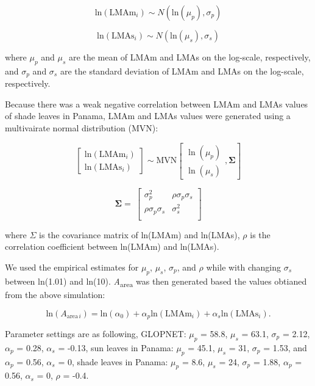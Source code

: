 \documentclass[
  12pt,
  letterpaper,
  DIV=11,
  numbers=noendperiod]{scrartcl}
\begin{document}
\[
\mathrm{ln}(\mathrm{LMAm}_{i}) \sim N(\mathrm{ln}(\mu_p), \sigma_p)
\]

\[
\mathrm{ln}(\mathrm{LMAs}_{i}) \sim N(\mathrm{ln}(\mu_s), \sigma_s)
\]

where \(\mu_p\) and \(\mu_s\) are the mean of LMAm and LMAs on the
log-scale, respectively, and \(\sigma_p\) and \(\sigma_s\) are the
standard deviation of LMAm and LMAs on the log-scale, respectively.

Because there was a weak negative correlation between LMAm and LMAs
values of shade leaves in Panama, LMAm and LMAs values were generated
using a multivairate normal distribution (MVN):

\[
\begin{bmatrix}
\mathrm{ln}(\mathrm{LMAm}_{i})\\
\mathrm{ln}(\mathrm{LMAs}_{i})
\end{bmatrix}
\sim \mathrm{MVN}
\left[
\begin{matrix}
\ln(\mu_{p})\\
\ln(\mu_{s})
\end{matrix}
,\mathbf{\Sigma}
\right]
\]

\[
\mathbf{\Sigma} = \
\begin{bmatrix}
\sigma_p^2 & \rho \sigma_p \sigma_s \\
\rho \sigma_p \sigma_s & \sigma_s^2 \\
\end{bmatrix}
\]

where \(\Sigma\) is the covariance matrix of ln(LMAm) and ln(LMAs),
\(\rho\) is the correlation coefficient between ln(LMAm) and ln(LMAs).

We used the empirical estimates for \(\mu_p\), \(\mu_s\), \(\sigma_p\),
and \(\rho\) while with changing \(\sigma_s\) between ln(1.01) and
ln(10). \emph{A}\textsubscript{area} was then generated based the values
obtianed from the above simulation:

\[
\mathrm{ln}(A_{\mathrm{area} \, i}) = \mathrm{ln}(\alpha_0) + \alpha_p\mathrm{ln}(\mathrm{LMAm}_{i}) + \alpha_s\mathrm{ln}(\mathrm{LMAs}_{i}).
\]

Parameter settings are as following, GLOPNET: \(\mu_p\) = 58.8,
\(\mu_s\) = 63.1, \(\sigma_p\) = 2.12, \(\alpha_p\) = 0.28, \(\alpha_s\)
= -0.13, sun leaves in Panama: \(\mu_p\) = 45.1, \(\mu_s\) = 31,
\(\sigma_p\) = 1.53, and \(\alpha_p\) = 0.56, \(\alpha_s\) = 0, shade
leaves in Panama: \(\mu_p\) = 8.6, \(\mu_s\) = 24, \(\sigma_p\) = 1.88,
\(\alpha_p\) = 0.56, \(\alpha_s\) = 0, \(\rho\) = -0.4.
\end{document}
